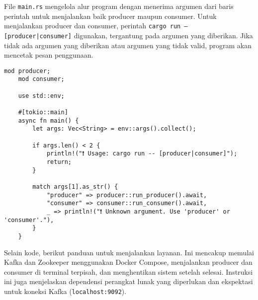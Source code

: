 File \texttt{main.rs} mengelola alur program dengan menerima argumen dari baris perintah untuk menjalankan baik producer maupun consumer. Untuk menjalankan producer dan consumer, perintah \texttt{cargo run -- [producer|consumer]} digunakan, tergantung pada argumen yang diberikan. Jika tidak ada argumen yang diberikan atau argumen yang tidak valid, program akan mencetak pesan penggunaan.

\begin{lstlisting}[style=RustStyle, caption={src/main.rs}]
	mod producer;
	mod consumer;
	
	use std::env;
	
	#[tokio::main]
	async fn main() {
		let args: Vec<String> = env::args().collect();
		
		if args.len() < 2 {
			println!("❗ Usage: cargo run -- [producer|consumer]");
			return;
		}
		
		match args[1].as_str() {
			"producer" => producer::run_producer().await,
			"consumer" => consumer::run_consumer().await,
			_ => println!("❗ Unknown argument. Use 'producer' or 'consumer'."),
		}
	}
\end{lstlisting}

Selain kode, berikut panduan untuk menjalankan layanan. Ini mencakup memulai Kafka dan Zookeeper menggunakan Docker Compose, menjalankan producer dan consumer di terminal terpisah, dan menghentikan sistem setelah selesai. Instruksi ini juga menjelaskan dependensi perangkat lunak yang diperlukan dan ekspektasi untuk koneksi Kafka (\texttt{localhost:9092}).

